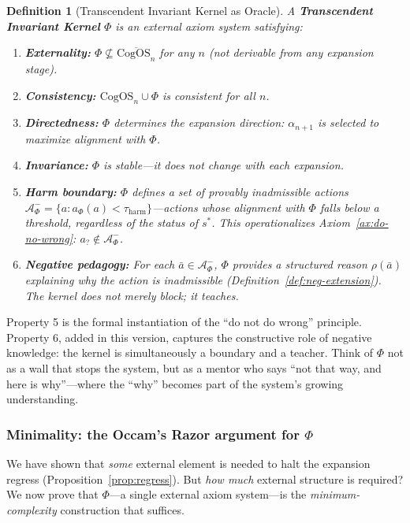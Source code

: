 \documentclass[11pt]{article}
\newtheorem{definition}{Definition}
\newcommand{\CogOS}{\text{CogOS}}
\begin{document}
\begin{definition}[Transcendent Invariant Kernel as Oracle]
\label{def:tik-oracle}
A \textbf{Transcendent Invariant Kernel} $\Phi$ is an external axiom system
satisfying:
\begin{enumerate}
\item \textbf{Externality:} $\Phi \not\subseteq \overline{\CogOS_n}$ for any
      $n$ (not derivable from any expansion stage).
\item \textbf{Consistency:} $\CogOS_n \cup \Phi$ is consistent for all $n$.
\item \textbf{Directedness:} $\Phi$ determines the expansion direction:
      $\alpha_{n+1}$ is selected to maximize alignment with $\Phi$.
\item \textbf{Invariance:} $\Phi$ is stable---it does not change with each
      expansion.
\item \textbf{Harm boundary:} $\Phi$ defines a set of \textit{provably
      inadmissible} actions
      $\mathcal{A}^-_\Phi = \{a : a_\Phi(a) < \tau_{\text{harm}}\}$---actions
      whose alignment with $\Phi$ falls below a threshold, regardless of the
      status of $s^*$. This operationalizes Axiom~\ref{ax:do-no-wrong}:
      $a_? \notin \mathcal{A}^-_\Phi$.
\item \textbf{Negative pedagogy:} For each $\bar{a} \in \mathcal{A}^-_\Phi$,
      $\Phi$ provides a structured reason $\rho(\bar{a})$ explaining
      \textit{why} the action is inadmissible
      (Definition~\ref{def:neg-extension}). The kernel does not merely block;
      it teaches.
\end{enumerate}
\end{definition}

\noindent Property 5 is the formal instantiation of the ``do not do wrong''
principle. Property 6, added in this version, captures the constructive role of
negative knowledge: the kernel is simultaneously a boundary and a teacher.
Think of $\Phi$ not as a wall that stops the system, but as a mentor who says
``not that way, and here is why''---where the ``why'' becomes part of the
system's growing understanding.


\subsubsection{Minimality: the Occam's Razor argument for $\Phi$}
\label{sec:occam}

We have shown that \textit{some} external element is needed to halt the
expansion regress (Proposition~\ref{prop:regress}). But \textit{how much}
external structure is required? We now prove that $\Phi$---a single external
axiom system---is the \textit{minimum-complexity} construction that suffices.
\end{document}
